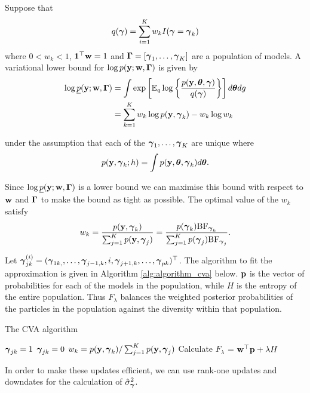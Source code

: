 Suppose that
\[
	q({\boldsymbol \gamma}) = \sum_{i=1}^K w_k I({\boldsymbol \gamma} = {\boldsymbol \gamma}_k)
\]
where $0 < w_k < 1$, ${\bf 1}^\top {\bf w} = 1$ and ${\boldsymbol \Gamma} = [{\boldsymbol \gamma}_1, \ldots, {\boldsymbol \gamma}_K]$ are a population of
models. A variational lower bound for $\log p({\bf y}; {\bf w}, {\boldsymbol \Gamma})$ is given by
\begin{align*}
	\log \underline{p}({\bf y}; {\bf w}, {\boldsymbol \Gamma}) &= \int \exp\left[ {\mathbb E}_q \log \left\{ \frac{p({\bf y}, {\boldsymbol \theta}, {\boldsymbol \gamma})}{q({\boldsymbol \gamma})} \right\} \right] d {\boldsymbol \theta} dg \\
	&= \sum_{k=1}^K w_k \log p({\bf y}, {\boldsymbol \gamma}_k) - w_k \log w_k
\end{align*}

under the assumption that each of the ${\boldsymbol \gamma}_1, \ldots, {\boldsymbol \gamma}_K$ are unique where
\[
	p({\bf y}, {\boldsymbol \gamma}_k; h) = \int p({\bf y}, {\boldsymbol \theta}, {\boldsymbol \gamma}_k) d {\boldsymbol \theta}.
\]

Since $\log \underline{p}({\bf y}; {\bf w}, {\boldsymbol \Gamma})$ is a lower bound we can maximise this bound with respect to
${\bf w}$ and ${\boldsymbol \Gamma}$ to make the bound as tight as possible. The optimal value of the $w_k$ satisfy
\begin{align*}
	w_k = \frac{p({\bf y}, {\boldsymbol \gamma}_k)}{\sum_{j=1}^K p({\bf y}, {\boldsymbol \gamma}_j)} = \frac{p({\boldsymbol \gamma}_k) \text{BF}_{{\boldsymbol \gamma}_k}}{\sum_{j=1}^K p({\boldsymbol \gamma}_j) \text{BF}_{{\boldsymbol \gamma}_j}}.
\end{align*}

Let ${\boldsymbol \gamma}_{jk}^{(i)} = ({\boldsymbol \gamma}_{1k, }, \ldots, {\boldsymbol \gamma}_{j-1, k}, i, {\boldsymbol \gamma}_{j+1, k}, \ldots, {\boldsymbol \gamma}_{pk})^\top$. The algorithm to fit the approximation is given in Algorithm \ref{alg:algorithm_cva} below. ${\bf p}$ is the
vector of probabilities for each of the models in the population, while $H$ is the entropy of the entire
population. Thus $F_\lambda$ balances the weighted posterior probabilities of the particles in the population
against the diversity within that population.

\begin{algorithm}
	\caption{The CVA algorithm}
	\label{alg:algorithm_cva}
	\begin{algorithmic}
						\STATE ${\boldsymbol \gamma}_{jk} = 1$
					\ELSE
						\STATE ${\boldsymbol \gamma}_{jk} = 0$
					\ENDIF
				\ENDFOR
				\STATE $w_k = p({\bf y}, {\boldsymbol \gamma}_k) / \sum_{j=1}^K p({\bf y}, {\boldsymbol \gamma}_j)$
			\ENDFOR
			\STATE Calculate $F_\lambda$ = ${\bf w}^\top {\bf p} + \lambda H$
		\ENDWHILE
	\end{algorithmic}
\end{algorithm}
In order to make these updates efficient, we can use rank-one updates and downdates for the calculation of
$\hat{\sigma}_{\boldsymbol \gamma}^2$.

